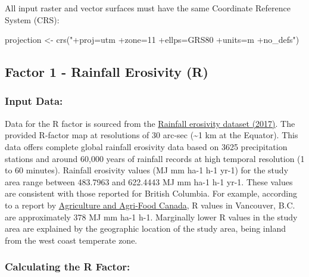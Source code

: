 \documentclass[
]{article}
\newenvironment{Shaded}{\begin{snugshade}}{\end{snugshade}}
\newcommand{\FunctionTok}[1]{\textcolor[rgb]{0.00,0.00,0.00}{#1}}
\newcommand{\NormalTok}[1]{#1}
\newcommand{\OtherTok}[1]{\textcolor[rgb]{0.56,0.35,0.01}{#1}}
\newcommand{\StringTok}[1]{\textcolor[rgb]{0.31,0.60,0.02}{#1}}
\begin{document}
All input raster and vector surfaces must have the same Coordinate Reference System (CRS):

\begin{Shaded}
\begin{Highlighting}[]
\NormalTok{projection }\OtherTok{\textless{}{-}} \FunctionTok{crs}\NormalTok{(}\StringTok{"+proj=utm +zone=11 +ellps=GRS80 +units=m +no\_defs"}\NormalTok{)}
\end{Highlighting}
\end{Shaded}

\hypertarget{sec-factor-1-method}{%
\subsection*{Factor 1 - Rainfall Erosivity (R)}\label{sec-factor-1-method}}

\hypertarget{sec-R-input-data}{%
\subsubsection*{Input Data:}\label{sec-R-input-data}}

Data for the R factor is sourced from the \href{https://esdac.jrc.ec.europa.eu/content/global-rainfall-erosivity\#tabs-0-description=1}{Rainfall erosivity dataset (2017)}. The provided R-factor map at resolutions of 30 arc-sec (\textasciitilde1 km at the Equator). This data offers complete global rainfall erosivity data based on 3625 precipitation stations and around 60,000 years of rainfall records at high temporal resolution (1 to 60 minutes). Rainfall erosivity values (MJ mm ha-1 h-1 yr-1) for the study area range between 483.7963 and 622.4443 MJ mm ha-1 h-1 yr-1. These values are consistent with those reported for British Columbia. For example, according to a report by \href{https://sis.agr.gc.ca/cansis/publications/manuals/2002-92/rusle-can.pdf}{Agriculture and Agri-Food Canada}, R values in Vancouver, B.C. are approximately 378 MJ mm ha-1 h-1. Marginally lower R values in the study area are explained by the geographic location of the study area, being inland from the west coast temperate zone.

\hypertarget{sec-calculating-the-r-factor}{%
\subsubsection*{Calculating the R Factor:}\label{sec-calculating-the-r-factor}}
\end{document}
